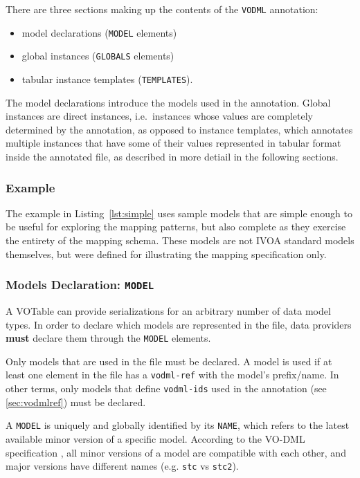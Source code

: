 \documentclass[11pt,a4paper]{ivoa}
\begin{document}
There are three sections making up the contents of the \texttt{VODML}
annotation:

\begin{itemize}
\itemsep1pt\parskip0pt
\item
  model declarations (\texttt{MODEL} elements)
\item
  global instances (\texttt{GLOBALS} elements)
\item
  tabular instance templates (\texttt{TEMPLATES}).
\end{itemize}

The model declarations introduce the models used in the annotation.
Global instances are direct instances, i.e.~instances whose values are
completely determined by the annotation, as opposed to instance
templates, which annotates multiple instances that have some of their
values represented in tabular format inside the annotated file, as
described in more detiail in the following sections.

\subsubsection{Example}\label{example}

The example in Listing~\ref{lst:simple} uses sample models that are simple
enough to be useful for exploring the mapping patterns, but also
complete as they exercise the entirety of the mapping schema. These
models are not IVOA standard models themselves, but were defined for
illustrating the mapping specification only.

\subsubsection{Models Declaration: \texttt{MODEL}}\label{sec:norm-model}

A VOTable can provide serializations for an arbitrary number of data
model types. In order to declare which models are represented in the
file, data providers \textbf{must} declare them through the
\texttt{MODEL} elements.

Only models that are used in the file must be declared. A model is used
if at least one element in the file has a \texttt{vodml-ref} with the
model's prefix/name. In other terms, only models that define
\texttt{vodml-ids} used in the annotation (see \ref{sec:vodmlref}) must
be declared.

A \texttt{MODEL} is uniquely and globally identified by its
\texttt{NAME}, which refers to the latest available minor version of a
specific model. According to the VO-DML specification \cite{2018ivoa.spec.0910L}, all
minor versions of a model are compatible with each other, and major
versions have different names (e.g. \texttt{stc} vs \texttt{stc2}).
\end{document}
